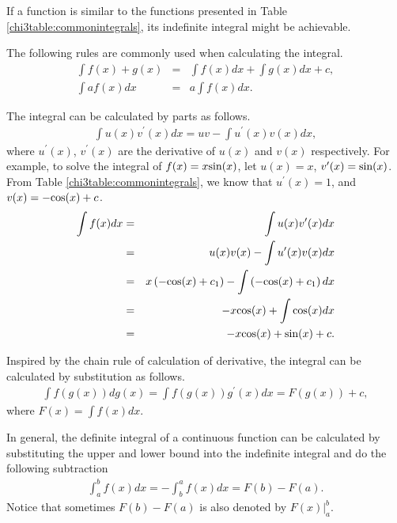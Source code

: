 If a function is similar to the functions presented in Table \ref{chi3table:commonintegrals}, its indefinite integral might be achievable.

The following rules are commonly used when calculating the integral.
\begin{eqnarray}
    \int f(x) + g(x) &=& \int f(x) dx + \int g(x) dx + c, \nonumber \\
    \int a f(x) dx &=& a \int f(x) dx. \nonumber
\end{eqnarray}

The integral can be calculated by parts as follows.
\begin{eqnarray}
    \int u(x)v^\prime(x)dx = uv - \int u^\prime(x)v(x)dx, \nonumber
\end{eqnarray}
where $u^\prime(x)$, $v^\prime(x)$ are the derivative of $u(x)$ and $v(x)$ respectively. For example, to solve the integral of $f(x)=x\textup{sin}(x)$, let $u(x)=x$, $v^\prime(x)=\textup{sin}(x)$. From Table \ref{chi3table:commonintegrals}, we know that $u^\prime(x)=1$, and $v(x) = -\textup{cos}(x) + c$.
\begin{eqnarray}
    \int f(x)dx &=& \int u(x)v^\prime(x)dx \nonumber \\
    &=& u(x)v(x) - \int u^\prime(x)v(x)dx \nonumber \\
    &=& x\left(-\textup{cos}(x) + c_1\right) - \int \left(-\textup{cos}(x) + c_1\right)dx \nonumber \\
    &=& -x\textup{cos}(x) + \int \textup{cos}(x)dx \nonumber \\
    &=& -x\textup{cos}(x) + \textup{sin}(x) + c. \nonumber
\end{eqnarray}

Inspired by the chain rule of calculation of derivative, the integral can be calculated by substitution as follows.
\begin{eqnarray}
    \int f\left(g(x)\right)dg(x) = \int f\left(g(x)\right)g^\prime(x)dx = F\left(g(x)\right) + c, \nonumber
\end{eqnarray}
where $F(x) = \int f(x)dx$.

In general, the definite integral of a continuous function can be calculated by substituting the upper and lower bound into the indefinite integral and do the following subtraction
\begin{eqnarray}
    \int_a^b f(x)dx = -\int_b^a f(x)dx = F(b) - F(a). \nonumber
\end{eqnarray}
Notice that sometimes $F(b)-F(a)$ is also denoted by $\left.F(x)\right|_a^b$.

